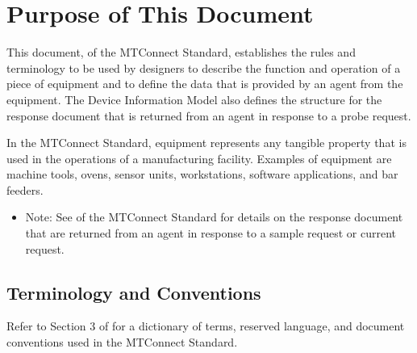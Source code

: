 
\section{Purpose of This Document}
\label{sec:Purpose of This Document}

This document,  of the MTConnect Standard, establishes the rules and terminology to be used by designers to describe the function and operation of a piece of equipment and to define the data that is provided by an \gls{agent} from the equipment.  The \gls{Device Information Model}  also defines the structure for the \gls{response document} that is returned from an \gls{agent} in response to a \gls{probe request}. 

In the MTConnect Standard, equipment represents any tangible property that is used in the operations of a manufacturing facility.  Examples of equipment are machine tools, ovens, sensor units, workstations, software applications, and bar feeders. 


\begin{itemize}
    \item Note: See  of the MTConnect Standard for details on the \gls{response document} that are returned from an \gls{agent} in response to a \gls{sample request} or \gls{current request}.

\end{itemize}

\subsection{Terminology and Conventions}
\label{sec:Terminology and Conventions}

Refer to Section 3 of  for a dictionary of terms, reserved language, and document conventions used in the MTConnect Standard.

\printglossary[title=General Terms, type=general]
\printglossary[title=Information Model Terms, type=informationmodel]
\printglossary[title=Protocol Terms, type=protocol]
\printglossary[title=HTTP Terms, type=http]
\printglossary[title=XML Terms, type=xml]
\printglossary[title=Concept Model Terms, type=conceptmodel]

\printacronyms

\printbibliography[title=MTConnect References,keyword=MTC]

\printbibliography[title=Other References,notkeyword=MTC]

\glsaddall